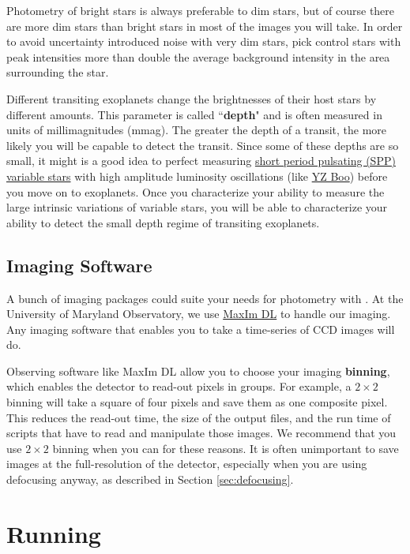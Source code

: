 \documentclass{article}
\begin{document}
Photometry of bright stars is always preferable to dim stars, but of course there are more dim stars than bright stars in most of the images you will take. In order to avoid uncertainty introduced noise with very dim stars, pick control stars with peak intensities more than double the average background intensity in the area surrounding the star. 

Different transiting exoplanets change the brightnesses of their host stars by different amounts. This parameter is called ``\textbf{depth}" and is often measured in units of millimagnitudes (mmag). The greater the depth of a transit, the more likely you will be capable to detect the transit. Since some of these depths are so small, it might is a good idea to perfect measuring \href{https://sites.google.com/site/aavsosppsection/}{short period pulsating (SPP) variable stars} with high amplitude luminosity oscillations (like \href{http://www.aavso.org/vsx/index.php?view=detail.top&oid=4356}{YZ Boo}) before you move on to exoplanets. Once you characterize your ability to measure the large intrinsic variations of variable stars, you will be able to characterize your ability to detect the small depth regime of transiting exoplanets. 

\subsection{Imaging Software}
A bunch of imaging packages could suite your needs for photometry with \oscaar. At the University of Maryland Observatory, we use \href{http://www.cyanogen.com/maxim_main.php}{MaxIm DL} to handle our imaging. Any imaging software that enables you to take a time-series of CCD images will do. 

Observing software like MaxIm DL allow you to choose your imaging \textbf{binning}, which enables the detector to read-out pixels in groups. For example, a $2\times2$ binning will take a square of four pixels and save them as one composite pixel. This reduces the read-out time, the size of the output files, and the run time of scripts that have to read and manipulate those images. We recommend that you use $2\times2$ binning when you can for these reasons. It is often unimportant to save images at the full-resolution of the detector, especially when you are using defocusing anyway, as described in Section \ref{sec:defocusing}. 

\section{Running \oscaar} \label{sec:run}
\end{document}
